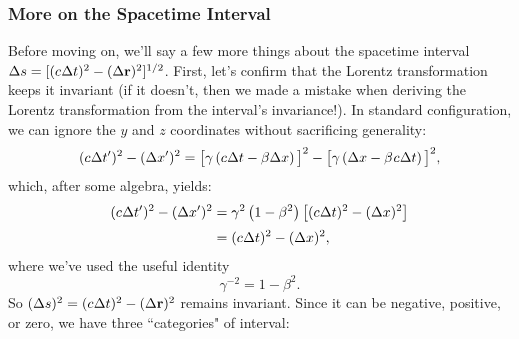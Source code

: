 \documentclass[12pt]{article}
\renewcommand{\vv}[1]{\mathbf{#1}}
\begin{document}
\subsubsection{More on the Spacetime Interval}
Before moving on, we'll say a few more things about the spacetime interval $\Delta s = [(c \mkern.5mu \Delta t)^2 - ( \Delta \vv r )^2]^{1/2}$. First, let's confirm that the Lorentz transformation keeps it invariant (if it doesn't, then we made a mistake when deriving the Lorentz transformation from the interval's invariance!). In standard configuration, we can ignore the $y$ and $z$ coordinates without sacrificing generality:
\begin{equation*}
(c \mkern.5mu \Delta t^{\prime})^2 - (\Delta x^{\prime})^2 = \big[ \gamma \left( c \mkern.5mu \Delta t - \beta \Delta x \right) \big] ^2 - \big[ \gamma \left( \Delta x - \beta \mkern1mu c \mkern.5mu \Delta t \right) \big]^2 ,
\end{equation*}
which, after some algebra, yields:
\begin{equation*}
\begin{aligned}
(c \mkern.5mu \Delta t^{\prime})^2 - (\Delta x^{\prime})^2 &= \gamma^2 \left( 1 - \beta^2 \right) \left[ (c \mkern.5mu \Delta t)^2 - ( \Delta x )^2 \right] \\[2pt]
&= (c \mkern.5mu \Delta t)^2 - ( \Delta x )^2 ,
\end{aligned}
\end{equation*}
where we've used the useful identity
\begin{equation}\label{eq:20}
\gamma^{-2} = 1 - \beta^2 .
\end{equation}
So $(\Delta s)^2 = (c \mkern.5mu \Delta t)^2 - ( \Delta \vv r )^2$ remains invariant. Since it can be negative, positive, or zero, we have three ``categories" of interval:
\end{document}
